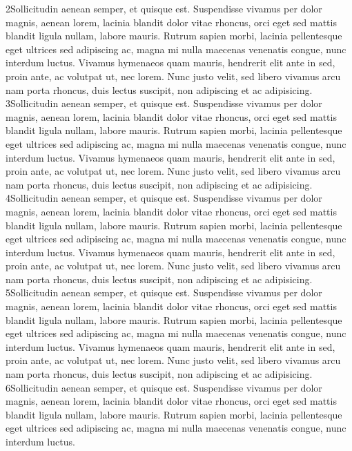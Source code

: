 2Sollicitudin aenean semper, et quisque est. Suspendisse vivamus per dolor magnis,
aenean lorem, lacinia blandit dolor vitae rhoncus, orci eget sed mattis blandit
ligula nullam, labore mauris. Rutrum sapien morbi, lacinia pellentesque eget ultrices
sed adipiscing ac, magna mi nulla maecenas venenatis congue, nunc interdum luctus.
Vivamus hymenaeos quam mauris, hendrerit elit ante in sed, proin ante, ac volutpat
ut, nec lorem. Nunc justo velit, sed libero vivamus arcu nam porta rhoncus, duis
lectus suscipit, non adipiscing et ac adipisicing.
3Sollicitudin aenean semper, et quisque est. Suspendisse vivamus per dolor magnis,
aenean lorem, lacinia blandit dolor vitae rhoncus, orci eget sed mattis blandit
ligula nullam, labore mauris. Rutrum sapien morbi, lacinia pellentesque eget ultrices
sed adipiscing ac, magna mi nulla maecenas venenatis congue, nunc interdum luctus.
Vivamus hymenaeos quam mauris, hendrerit elit ante in sed, proin ante, ac volutpat
ut, nec lorem. Nunc justo velit, sed libero vivamus arcu nam porta rhoncus, duis
lectus suscipit, non adipiscing et ac adipisicing.
4Sollicitudin aenean semper, et quisque est. Suspendisse vivamus per dolor magnis,
aenean lorem, lacinia blandit dolor vitae rhoncus, orci eget sed mattis blandit
ligula nullam, labore mauris. Rutrum sapien morbi, lacinia pellentesque eget ultrices
sed adipiscing ac, magna mi nulla maecenas venenatis congue, nunc interdum luctus.
Vivamus hymenaeos quam mauris, hendrerit elit ante in sed, proin ante, ac volutpat
ut, nec lorem. Nunc justo velit, sed libero vivamus arcu nam porta rhoncus, duis
lectus suscipit, non adipiscing et ac adipisicing.
5Sollicitudin aenean semper, et quisque est. Suspendisse vivamus per dolor magnis,
aenean lorem, lacinia blandit dolor vitae rhoncus, orci eget sed mattis blandit
ligula nullam, labore mauris. Rutrum sapien morbi, lacinia pellentesque eget ultrices
sed adipiscing ac, magna mi nulla maecenas venenatis congue, nunc interdum luctus.
Vivamus hymenaeos quam mauris, hendrerit elit ante in sed, proin ante, ac volutpat
ut, nec lorem. Nunc justo velit, sed libero vivamus arcu nam porta rhoncus, duis
lectus suscipit, non adipiscing et ac adipisicing.
6Sollicitudin aenean semper, et quisque est. Suspendisse vivamus per dolor magnis,
aenean lorem, lacinia blandit dolor vitae rhoncus, orci eget sed mattis blandit
ligula nullam, labore mauris. Rutrum sapien morbi, lacinia pellentesque eget ultrices
sed adipiscing ac, magna mi nulla maecenas venenatis congue, nunc interdum luctus.
